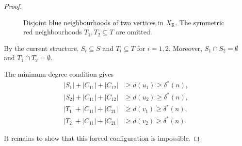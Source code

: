 \documentclass[12pt,reqno,a4paper]{amsart}
\newcommand{\R}{\mathrm{R}}
\begin{document}
\begin{proof}
\begin{figure}[htbp]

    \caption{Disjoint blue neighbourhoods of two vertices in $X_{\R}$. The
    symmetric red neighbourhoods $T_1,T_2\subseteq T$ are omitted.}
    \label{fig:structure_for_conclusion}
\end{figure}

By the current structure, $S_i\subseteq S$ and $T_i\subseteq T$ for $i=1,2$.
Moreover, $S_1\cap S_2=\emptyset$ and $T_1\cap T_2=\emptyset$.

The minimum-degree condition gives
\begin{align}
|S_1|+|C_{11}|+|C_{12}| &\ge d(u_1)\ge\delta^*(n), \label{eq:delta*-1}\\
|S_2|+|C_{11}|+|C_{12}| &\ge d(u_2)\ge\delta^*(n), \label{eq:delta*-2}\\
|T_1|+|C_{11}|+|C_{21}| &\ge d(v_1)\ge\delta^*(n), \label{eq:delta*-3}\\
|T_2|+|C_{11}|+|C_{21}| &\ge d(v_2)\ge\delta^*(n). \label{eq:delta*-4}
\end{align}

It remains to show that this forced configuration is impossible.


\end{proof}
\end{document}
